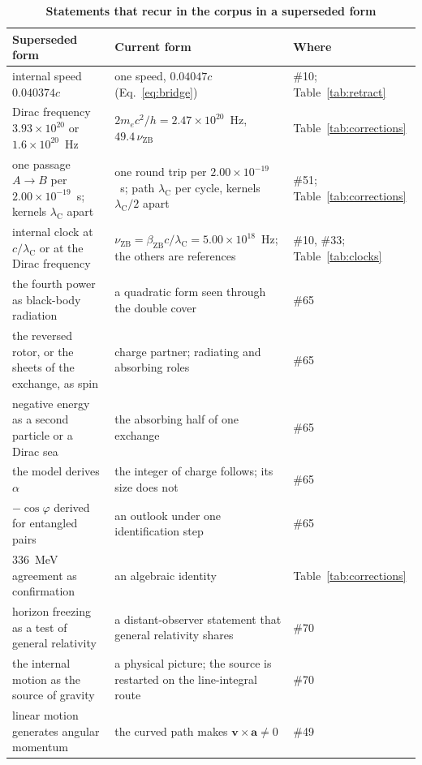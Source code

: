 \documentclass[%
 reprint, amsmath,amssymb, aps, prb, ]{revtex4-2}
\numberwithin{equation}{section}
\newcommand{\betaZB}{\beta_{\text{ZB}}}
\newcommand{\lambdaC}{\lambda_{\text{C}}}
\newcommand{\nuZB}{\nu_{\text{ZB}}}
\begin{document}
\begin{table}[t!]
\centering
\caption{\textbf{Statements that recur in the corpus in a superseded form}}
\label{tab:superseded}
\renewcommand{\arraystretch}{1.32}
\setlength{\tabcolsep}{7pt}
\begin{tabular}{>{\raggedright\arraybackslash}p{6.0cm}>{\raggedright\arraybackslash}p{6.6cm}>{\raggedright\arraybackslash}p{3.4cm}}
\toprule
\textbf{Superseded form} & \textbf{Current form} & \textbf{Where} \\
\midrule
internal speed $0.040374c$ & one speed, $0.04047c$ (Eq.~\eqref{eq:bridge}) & \#10; Table~\ref{tab:retract} \\
Dirac frequency $3.93\times10^{20}$ or $1.6\times10^{20}$~Hz & $2m_ec^{2}/h = 2.47\times10^{20}$~Hz, $49.4\,\nuZB$ & Table~\ref{tab:corrections} \\
one passage $A\to B$ per $2.00\times10^{-19}$~s; kernels $\lambdaC$ apart & one round trip per $2.00\times10^{-19}$~s; path $\lambdaC$ per cycle, kernels $\lambdaC/2$ apart & \#51; Table~\ref{tab:corrections} \\
internal clock at $c/\lambdaC$ or at the Dirac frequency & $\nuZB = \betaZB c/\lambdaC = 5.00\times10^{18}$~Hz; the others are references & \#10, \#33; Table~\ref{tab:clocks} \\
the fourth power as black-body radiation & a quadratic form seen through the double cover & \#65 \\
the reversed rotor, or the sheets of the exchange, as spin & charge partner; radiating and absorbing roles & \#65 \\
negative energy as a second particle or a Dirac sea & the absorbing half of one exchange & \#65 \\
the model derives $\alpha$ & the integer of charge follows; its size does not & \#65 \\
$-\cos\varphi$ derived for entangled pairs & an outlook under one identification step & \#65 \\
$336$~MeV agreement as confirmation & an algebraic identity & Table~\ref{tab:corrections} \\
horizon freezing as a test of general relativity & a distant-observer statement that general relativity shares & \#70 \\
the internal motion as the source of gravity & a physical picture; the source is restarted on the line-integral route & \#70 \\
linear motion generates angular momentum & the curved path makes $\mathbf v\times\mathbf a\neq0$ & \#49 \\
\bottomrule
\end{tabular}
\end{table}
\end{document}
